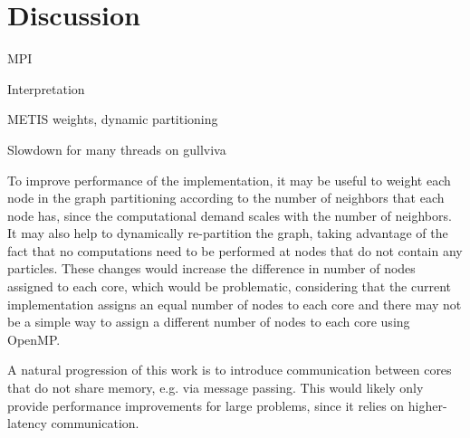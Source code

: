 \section{Discussion}
\label{sec:discussion}
MPI

Interpretation

METIS weights, dynamic partitioning

Slowdown for many threads on gullviva



To improve performance of the implementation, it may be useful to weight each node in the graph partitioning according to the number of neighbors that each node has, since the computational demand scales with the number of neighbors. It may also help to dynamically re-partition the graph, taking advantage of the fact that no computations need to be performed at nodes that do not contain any particles. These changes would increase the difference in number of nodes assigned to each core, which would be problematic, considering that the current implementation assigns an equal number of nodes to each core and there may not be a simple way to assign a different number of nodes to each core using OpenMP.

A natural progression of this work is to introduce communication between cores that do not share memory, e.g. via message passing. This would likely only provide performance improvements for large problems, since it relies on higher-latency communication.